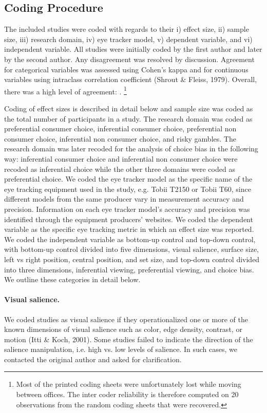 \documentclass{article}
\begin{document}
\subsection{Coding Procedure}

The included studies were coded with regards to their i) effect size, ii) sample size, iii) research domain, iv) eye tracker model, v) dependent variable, and vi) independent variable. All studies were initially coded by the first author and later by the second author. Any disagreement was resolved by discussion. Agreement for categorical variables was assessed using Cohen's kappa and for continuous variables using intraclass correlation coefficient (Shrout \& Fleiss, 1979). Overall, there was a high level of agreement: .%
%
\footnote{Most of the printed coding sheets were unfortunately lost while moving between offices. The inter coder reliability is therefore computed on 20 observations from the random coding sheets that were recovered.}

Coding of effect sizes is described in detail below and sample size was coded as the total number of participants in a study. The research domain was coded as preferential consumer choice, inferential consumer choice, preferential non consumer choice, inferential non consumer choice, and risky gambles. The research domain was later recoded for the analysis of choice bias in the following way: inferential consumer choice and inferential non consumer choice were recoded as inferential choice while the other three domains were coded as preferential choice. We coded the eye tracker model as the specific name of the eye tracking equipment used in the study, e.g. Tobii T2150 or Tobii T60, since different models from the same producer vary in measurement accuracy and precision. Information on each eye tracker model's accuracy and precision was identified through the equipment producers' websites. We coded the dependent variable as the specific eye tracking metric in which an effect size was reported. We coded the independent variable as bottom-up control and top-down control, with bottom-up control divided into five dimensions, visual salience, surface size, left vs right position, central position, and set size, and top-down control divided into three dimensions, inferential viewing, preferential viewing, and choice bias. We outline these categories in detail below. 

\paragraph{Visual salience.} We coded studies as visual salience if they operationalized one or more of the known dimensions of visual salience such as color, edge density, contrast, or motion (Itti \& Koch, 2001). Some studies failed to indicate the direction of the salience manipulation, i.e. high vs. low levels of salience. In such cases, we contacted the original author and asked for clarification.
\end{document}
